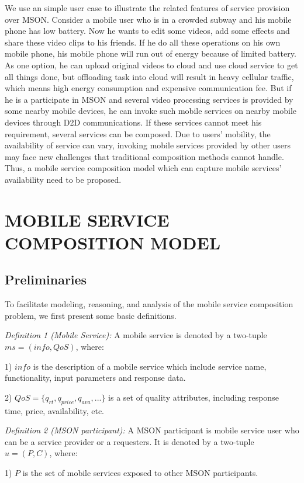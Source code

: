 \documentclass[10pt,journal,compsoc]{IEEEtran}
\begin{document}
We use an simple user case to illustrate the related features of service provision over MSON. 
Consider a mobile user who is in a crowded subway and his mobile phone has low battery. 
Now he wants to edit some videos, add some effects and share these video clips to his friends. 
If he do all these operations on his own mobile phone, his mobile phone will run out of energy because of limited battery. 
As one option, he can upload original videos to cloud and use cloud service to get all things done, but offloading task into cloud will result in heavy cellular traffic, which means high energy consumption and expensive communication fee.
But if he is a participate in MSON and several video processing services is provided by some nearby mobile devices, he can invoke such mobile services on nearby mobile devices through D2D communications. 
If these services cannot meet his requirement, several services can be composed. 
Due to users' mobility, the availability of service can vary, invoking mobile services provided by other users may face new challenges that traditional composition methods cannot handle. 
Thus, a mobile service composition model which can capture mobile services' availability need to be proposed.

\section{MOBILE SERVICE COMPOSITION MODEL}
\subsection{Preliminaries}
To facilitate modeling, reasoning, and analysis of the mobile service composition problem, we first present some basic definitions.

\textit{Definition 1 (Mobile Service):} A mobile service is denoted by a two-tuple $ms = (info, QoS)$, where:

1) $info$ is the description of a mobile service which include service name, functionality, input parameters and response data.

​2) $QoS = \{ q_{rt}, q_{price}, q_{ava}, ... \}$ is a set of quality attributes, including response time, price, availability, etc.

\textit{Definition 2 (MSON participant):} A MSON participant is mobile service user who can be a service provider or a requesters. It is denoted by a two-tuple $u = (P, C)$, where:

​1) $P$ is the set of mobile services exposed to other MSON participants.
\end{document}
